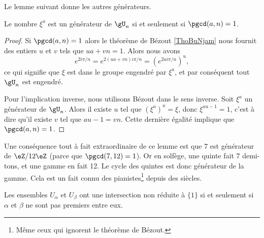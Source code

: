 Le lemme suivant donne les autres générateurs.
\begin{lemma}   \label{LemcFTNMa}
    Le nombre \( \xi^a\) est un générateur de \( \gU_n\) si et seulement si \( \pgcd(a,n)=1\).
\end{lemma}

\begin{proof}
    Si \( \pgcd(a,n)=1\) alors le théorème de Bézout \ref{ThoBuNjam} nous fournit des entiers \( u\) et \( v\) tels que \( ua+vn=1\). Alors nous avons
    \begin{equation}
        e^{2i\pi /n}= e^{2(ua+vn)i\pi/n}=( e^{2ai\pi/n})^u,
    \end{equation}
    ce qui signifie que \( \xi\) est dans le groupe engendré par \( \xi^a\), et par conséquent tout \( \gU_n\) est engendré.

    Pour l'implication inverse, nous utilisons Bézout dans le sens inverse. Soit \( \xi^a\) un générateur de \( \gU_n\). Alors il existe \( u\) tel que \( (\xi^a)^u=\xi\), donc \( \xi^{au-1}=1\), c'est à dire qu'il existe \( v\) tel que \( au-1=vn\). Cette dernière égalité implique que \( \pgcd(a,n)=1\).
\end{proof}

\begin{example}
Une conséquence tout à fait extraordinaire de ce lemme est que \( 7\) est générateur de \( \eZ/12\eZ\) (parce que \( \pgcd(7,12)=1\)). Or en solfège, une quinte fait \( 7\) demi-tons, et une gamme en fait 12. Le cycle des quintes est donc générateur de la gamme\cite{YDXsAM}. Cela est un fait connu des pianistes\footnote{Même ceux qui ignorent le théorème de Bézout.} depuis des siècles.
\end{example}

\begin{proposition}
    Les ensembles \( U_{\alpha}\) et \( U_{\beta}\) ont une intersection non réduite à \( \{ 1 \}\) si et seulement si \( \alpha\) et \( \beta\) ne sont pas premiers entre eux.
\end{proposition}

